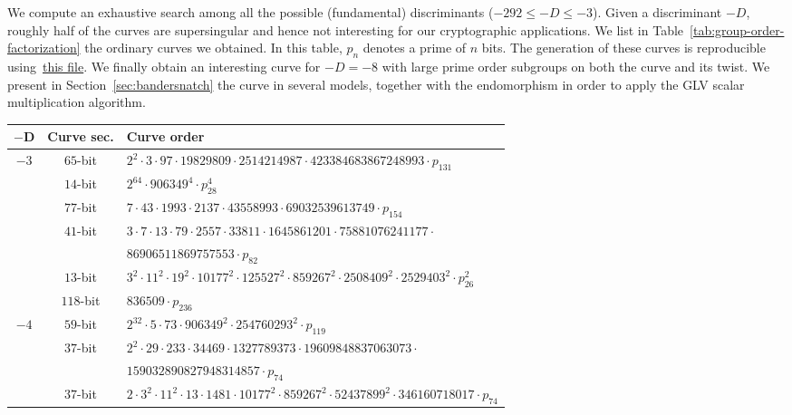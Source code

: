 \documentclass{article}
\theoremstyle{definition}
\begin{document}
We compute an exhaustive search among all the possible (fundamental)
discriminants ($-292 \leq -D \leq -3$).
Given a discriminant $-D$, roughly half of the curves are
supersingular and hence not interesting for our cryptographic
applications.
We list in Table~\ref{tab:group-order-factorization} the ordinary
curves we obtained. In this table, $p_n$ denotes a prime of $n$ bits.
The generation of these curves is reproducible
using~\href{https://github.com/asanso/Bandersnatch/blob/main/code/small-disc-curves.py}{this
  file}.
We finally obtain an interesting curve for $-D = -8$ with large prime
order subgroups on both the curve and its twist.
We present in Section~\ref{sec:bandersnatch} the curve in several
models, together with the endomorphism in order to apply the GLV
scalar multiplication algorithm.

\begin{table*}[!ht]
    \centering\footnotesize
    \begin{tabularx}{\textwidth}{ccl}
        \toprule                            
        $\mathbf{-D}$    & \textbf{Curve sec.}  & \textbf{Curve order} \\
        \midrule        
$-3$ & $65$-bit & $2^{2}  \cdot 3  \cdot 97  \cdot 19829809  \cdot 2514214987  \cdot 423384683867248993  \cdot p_{131}$\\
 & $14$-bit & $2^{64}  \cdot 906349^{4}  \cdot p_{28}^{4}$\\
 & $77$-bit & $7  \cdot 43  \cdot 1993  \cdot 2137  \cdot 43558993  \cdot 69032539613749  \cdot p_{154}$\\
 & $41$-bit & $3  \cdot 7  \cdot 13  \cdot 79  \cdot 2557  \cdot 33811
        \cdot 1645861201  \cdot 75881076241177 \cdot$\\
 &          & $86906511869757553  \cdot p_{82}$\\
 & $13$-bit & $3^{2}  \cdot 11^{2}  \cdot 19^{2}  \cdot 10177^{2}  \cdot 125527^{2}  \cdot 859267^{2}  \cdot 2508409^{2}  \cdot 2529403^{2}  \cdot p_{26}^{2}$\\
 & $118$-bit & $836509  \cdot p_{236}$\\
$-4$ & $59$-bit & $2^{32}  \cdot 5  \cdot 73  \cdot 906349^{2}  \cdot 254760293^{2}  \cdot p_{119}$\\
 & $37$-bit & $2^{2}  \cdot 29  \cdot 233  \cdot 34469  \cdot
        1327789373  \cdot 19609848837063073 \cdot$\\
 &          & $159032890827948314857  \cdot p_{74}$\\
 & $37$-bit & $2  \cdot 3^{2}  \cdot 11^{2}  \cdot 13  \cdot 1481  \cdot 10177^{2}  \cdot 859267^{2}  \cdot 52437899^{2}  \cdot 346160718017  \cdot p_{74}$\\

\end{tabularx}
\end{table*}
\end{document}
